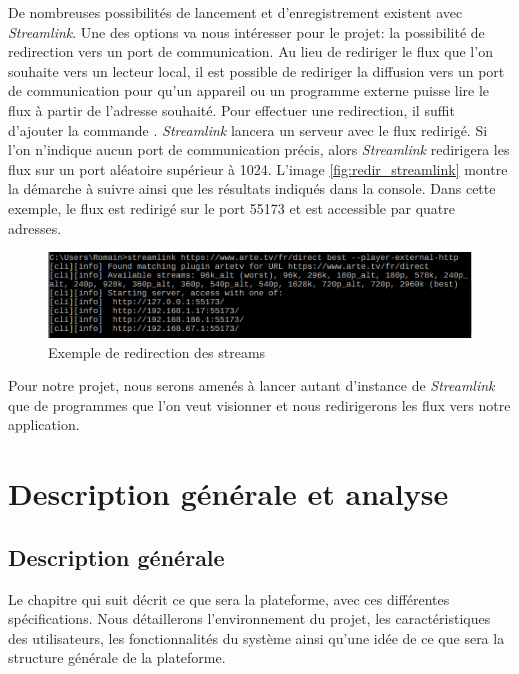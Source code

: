 \documentclass{polytech/polytech}
\begin{document}
De nombreuses possibilités de lancement et d'enregistrement existent avec \textit{Streamlink}. Une des options va nous intéresser pour le projet: la possibilité de redirection vers un port de communication. Au lieu de rediriger le flux que l'on souhaite vers un lecteur local, il est possible de rediriger la diffusion vers un port de communication pour qu'un appareil ou un programme externe puisse lire le flux à partir de l'adresse souhaité. Pour effectuer une redirection, il suffit d'ajouter la commande . \textit{Streamlink} lancera un serveur avec le flux redirigé. Si l'on n'indique aucun port de communication précis, alors \textit{Streamlink} redirigera les flux sur un port aléatoire supérieur à 1024. L'image \autoref{fig:redir_streamlink} montre la démarche à suivre ainsi que les résultats indiqués dans la console. Dans cette exemple, le flux est redirigé sur le port 55173 et est accessible par quatre adresses.


\begin{figure}
	\includegraphics[scale=0.75]{images/streamlinkHttp.png}
	\caption{Exemple de redirection des streams}
	\label{fig:redir_streamlink}
\end{figure}


Pour notre projet, nous serons amenés à lancer autant d'instance de \textit{Streamlink} que de programmes que l'on veut visionner et nous redirigerons les flux vers notre application.


\part{Description générale et analyse}


\chapter{Description générale}
\label{chap:description}

Le chapitre qui suit décrit ce que sera la plateforme, avec ces différentes spécifications. Nous détaillerons l’environnement du projet, les caractéristiques des utilisateurs, les fonctionnalités du système ainsi qu’une idée de ce que sera la structure générale de la plateforme.
\end{document}
